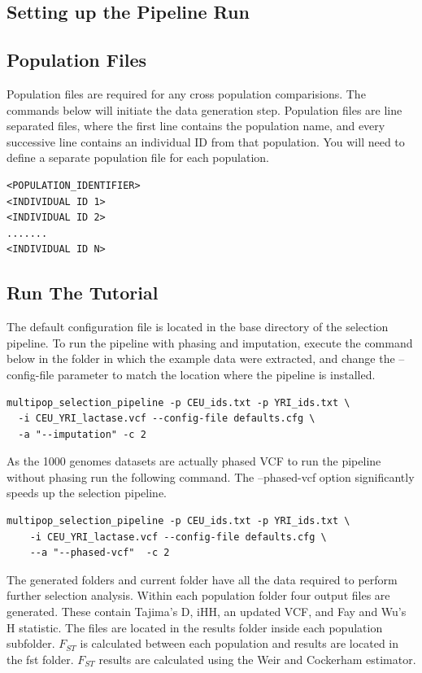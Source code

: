 \documentclass[a4paper,10pt]{article}
\begin{document}
\subsection{Setting up the Pipeline Run}
\subsection{Population Files}
Population files are required for any cross population
comparisions. The commands below will initiate the data generation
step. Population files are line separated files, where the first line
contains the population name, and every successive line contains an
individual ID from that population. You will need to define a separate
population file for each population.\\

\begin{verbatim}
<POPULATION_IDENTIFIER>
<INDIVIDUAL ID 1>
<INDIVIDUAL ID 2>
.......
<INDIVIDUAL ID N>
\end{verbatim}
\subsection{Run The Tutorial}
The default configuration file is located in the base directory of the
selection pipeline. To run the pipeline with phasing and imputation, execute the command below in the folder in which the example data were extracted, and change the
--config-file parameter to match the location where the pipeline is installed.\\
\begin{verbatim}
multipop_selection_pipeline -p CEU_ids.txt -p YRI_ids.txt \
  -i CEU_YRI_lactase.vcf --config-file defaults.cfg \
  -a "--imputation" -c 2
\end{verbatim}

\noindent
As the 1000 genomes datasets are actually phased VCF to run the pipeline without phasing run the following command. The --phased-vcf option significantly speeds up the selection pipeline.

\begin{verbatim}
multipop_selection_pipeline -p CEU_ids.txt -p YRI_ids.txt \
    -i CEU_YRI_lactase.vcf --config-file defaults.cfg \
    --a "--phased-vcf"  -c 2  
\end{verbatim} 

\noindent
The generated folders and current folder have all the data required to
perform further selection analysis. Within each population folder four
output files are generated.  These contain Tajima's D, iHH, an updated
VCF, and Fay and Wu's H statistic. The files are located in the
results folder inside each population subfolder. $F_{ST}$ is calculated
between each population and results are located in the fst folder. $F_{ST}$
results are calculated using the Weir and Cockerham estimator.
\end{document}
